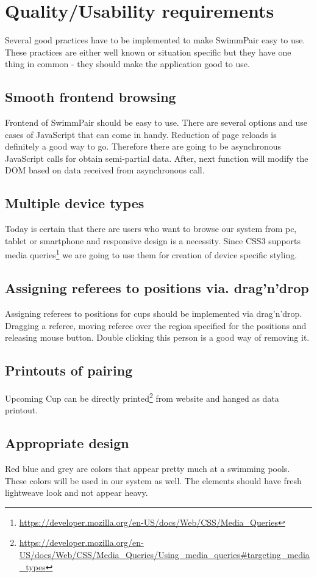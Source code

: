 \section{Quality/Usability requirements}
Several good practices have to be implemented to make SwimmPair easy to use. These practices are either well known or situation specific but they have one thing in common - they should make the application good to use.
\subsection*{Smooth frontend browsing}
\par
Frontend of SwimmPair should be easy to use. There are several options and use cases of JavaScript that can come in handy. Reduction of page reloads is definitely a good way to go. Therefore there are going to be asynchronous JavaScript calls for obtain semi-partial data. After, next function will modify the DOM based on data received from asynchronous call. 
\subsection*{Multiple device types}
\par
Today is certain that there are users who want to browse our system from pc, tablet or smartphone and responsive design is a necessity. Since CSS3 supports media queries\footnote{\url{https://developer.mozilla.org/en-US/docs/Web/CSS/Media_Queries}} we are going to use them for creation of device specific styling.
\subsection*{Assigning referees to positions via. drag'n'drop}
\par
Assigning referees to positions for cups should be implemented via drag'n'drop. Dragging a referee, moving referee over the region specified for the positions and releasing mouse button. Double clicking this person is a good way of removing it.
\subsection*{Printouts of pairing}
Upcoming Cup can be directly printed\footnote{\url{https://developer.mozilla.org/en-US/docs/Web/CSS/Media_Queries/Using_media_queries\#targeting_media_types}} from website and hanged as data printout. 
\subsection*{Appropriate design}
\par
Red blue and grey are colors that appear pretty much at a swimming pools. These colors will be used in our system as well. The elements should have fresh lightweave look and not appear heavy.
